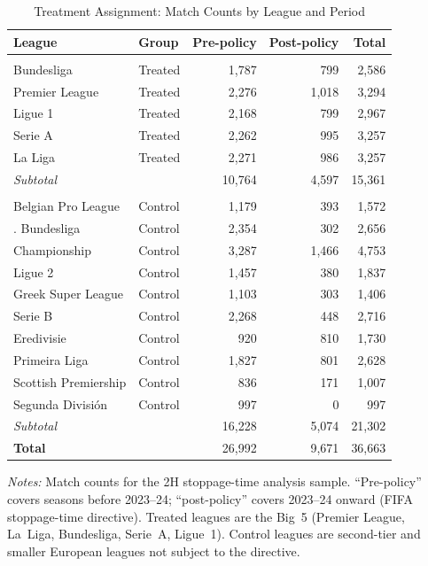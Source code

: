 \begin{table}[htbp]
\centering
\begin{threeparttable}
\caption{Treatment Assignment: Match Counts by League and Period}
\label{tab:first_stage_summary}
\begin{tabular}{llrrr}
\toprule
League & Group & Pre-policy & Post-policy & Total \\
\midrule
\addlinespace
\multicolumn{5}{l}{\textit{Treated (Big 5)}} \\
\addlinespace[3pt]
\quad Bundesliga & Treated & 1,787 & 799 & 2,586 \\
\quad Premier League & Treated & 2,276 & 1,018 & 3,294 \\
\quad Ligue 1 & Treated & 2,168 & 799 & 2,967 \\
\quad Serie A & Treated & 2,262 & 995 & 3,257 \\
\quad La Liga & Treated & 2,271 & 986 & 3,257 \\
\addlinespace
\quad \textit{Subtotal} & & 10,764 & 4,597 & 15,361 \\
\addlinespace
\multicolumn{5}{l}{\textit{Control}} \\
\addlinespace[3pt]
\quad Belgian Pro League & Control & 1,179 & 393 & 1,572 \\
\quad 2. Bundesliga & Control & 2,354 & 302 & 2,656 \\
\quad Championship & Control & 3,287 & 1,466 & 4,753 \\
\quad Ligue 2 & Control & 1,457 & 380 & 1,837 \\
\quad Greek Super League & Control & 1,103 & 303 & 1,406 \\
\quad Serie B & Control & 2,268 & 448 & 2,716 \\
\quad Eredivisie & Control & 920 & 810 & 1,730 \\
\quad Primeira Liga & Control & 1,827 & 801 & 2,628 \\
\quad Scottish Premiership & Control & 836 & 171 & 1,007 \\
\quad Segunda División & Control & 997 & 0 & 997 \\
\addlinespace
\quad \textit{Subtotal} & & 16,228 & 5,074 & 21,302 \\
\midrule
\textbf{Total} & & 26,992 & 9,671 & 36,663 \\
\bottomrule
\end{tabular}
\begin{tablenotes}[flushleft]
\footnotesize
\item \textit{Notes:} Match counts for the 2H stoppage-time analysis sample.
``Pre-policy'' covers seasons before 2023--24; ``post-policy'' covers 2023--24 onward
(FIFA stoppage-time directive). Treated leagues are the Big~5 (Premier League,
La~Liga, Bundesliga, Serie~A, Ligue~1). Control leagues are second-tier and
smaller European leagues not subject to the directive.
\end{tablenotes}
\end{threeparttable}
\end{table}
